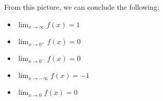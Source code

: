 \documentclass[10pt,a4paper]{article}
\theoremstyle{definition}
\begin{document}
From this picture, we can conclude the following:
\begin{itemize}
\item $\displaystyle \lim_{x \to \infty}f(x) = 1$
\item $\displaystyle \lim_{x \to 0^+}f(x) = 0$
\item $\displaystyle \lim_{x \to 0^-}f(x) = 0$
\item $\displaystyle \lim_{x \to -\infty}f(x) = -1$
\item $\displaystyle \lim_{x \to 0}f(x) = 0$
\end{itemize}
\end{document}
